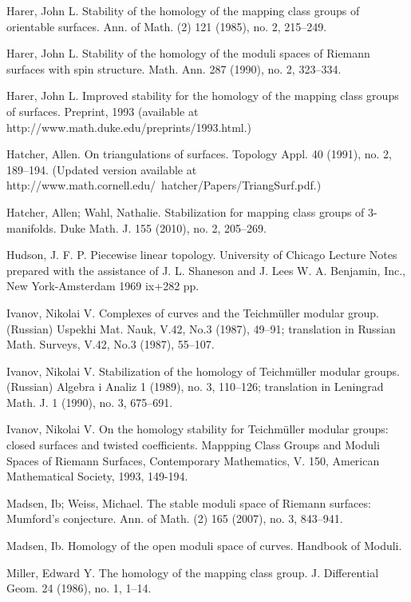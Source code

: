 \documentclass[10pt]{amsart}
\begin{document}
\begin{thebibliography}{21}
 Harer, John L. Stability of the homology of the mapping class groups of orientable surfaces.  Ann. of Math. (2)  121  (1985),  no. 2, 215--249.


 Harer, John L. Stability of the homology of the moduli spaces of Riemann surfaces with spin structure.  Math. Ann.  287  (1990),
no. 2, 323--334. 

 Harer, John L. Improved stability for the homology of the mapping class groups of surfaces. Preprint, 1993 (available at 
http://www.math.duke.edu/preprints/1993.html.)

 Hatcher, Allen. 
On triangulations of surfaces.
Topology Appl. 40 (1991), no. 2, 189--194. (Updated version available at http://www.math.cornell.edu/~hatcher/Papers/TriangSurf.pdf.)

 Hatcher, Allen; Wahl, Nathalie. Stabilization for mapping
  class groups of 3-manifolds. Duke Math. J. 155 (2010), no. 2, 205–269. 



 Hudson, J. F. P. Piecewise linear topology. University of Chicago Lecture Notes prepared with the assistance of
  J. L. Shaneson and J. Lees W. A. Benjamin, Inc., New York-Amsterdam 1969 ix+282 pp.


 Ivanov, Nikolai V. Complexes of curves and the Teichm\"{u}ller modular group. (Russian)
Uspekhi Mat. Nauk, V.42, No.3 (1987), 49--91; translation in 
Russian Math. Surveys, V.42, No.3 (1987), 55--107.

 Ivanov, Nikolai V. Stabilization of the homology of Teichm\"{u}ller modular groups. (Russian)  Algebra i Analiz  1  (1989),  no. 3, 110--126;  translation in  Leningrad Math. J.  1  (1990),  no. 3, 675--691. 


 Ivanov, Nikolai V. On the homology stability for Teichm\"{u}ller modular groups: closed surfaces and twisted coefficients. Mappping Class Groups and Moduli Spaces of Riemann Surfaces,
Contemporary Mathematics, V. 150, American Mathematical Society, 1993, 149-194. 

 Madsen, Ib; Weiss, Michael. The stable moduli space of Riemann surfaces: Mumford's conjecture.  Ann. of Math. (2)  165  (2007),  no. 3, 843--941.

 Madsen, Ib. Homology of the open moduli space of curves. Handbook of Moduli. 

 Miller, Edward Y. The homology of the mapping class group.
J. Differential Geom. 24 (1986), no. 1, 1--14. 


\end{thebibliography}
\end{document}
